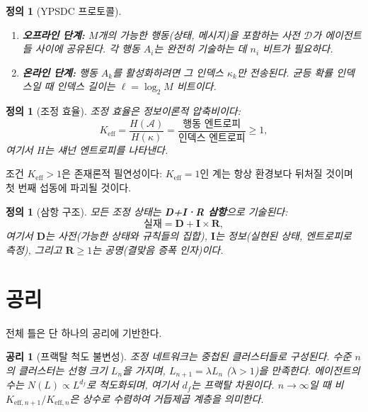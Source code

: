 \documentclass[12pt,a4paper]{article}
\newtheorem{axiom}[theorem]{공리}
\newtheorem{definition}[theorem]{정의}
\theoremstyle{remark}
\newcommand{\Keff}{K_{\mathrm{eff}}}
\begin{document}
	\begin{definition}[YPSDC 프로토콜]
		\begin{enumerate}[label=(\roman*)]
			\item \textbf{오프라인 단계:} \(M\)개의 가능한 행동(상태, 메시지)을 포함하는 사전 \(\mathcal{D}\)가 에이전트들 사이에 공유된다. 각 행동 \(A_i\)는 완전히 기술하는 데 \(n_i\) 비트가 필요하다.
			\item \textbf{온라인 단계:} 행동 \(A_k\)를 활성화하려면 그 인덱스 \(\kappa_k\)만 전송된다. 균등 확률 인덱스일 때 인덱스 길이는 \(\ell = \log_2 M\) 비트이다.
		\end{enumerate}
	\end{definition}
	
	\begin{definition}[조정 효율]
		조정 효율은 정보이론적 압축비이다:
		\begin{equation}
			\Keff = \frac{H(\mathcal{A})}{H(\kappa)} = \frac{\text{행동 엔트로피}}{\text{인덱스 엔트로피}} \ge 1,
			\label{eq:keff}
		\end{equation}
		여기서 \(H\)는 섀넌 엔트로피를 나타낸다.
	\end{definition}
	
	조건 \(K_{\mathrm{eff}} > 1\)은 존재론적 필연성이다: \(K_{\mathrm{eff}} = 1\)인 계는 항상 환경보다 뒤처질 것이며 첫 번째 섭동에 파괴될 것이다.
	
	\begin{definition}[삼항 구조]
		모든 조정 상태는 \textbf{D+I·R 삼항}으로 기술된다:
		\[
		\text{실재} = \mathbf{D} + \mathbf{I} \times \mathbf{R},
		\]
		여기서 \(\mathbf{D}\)는 사전(가능한 상태와 규칙들의 집합), \(\mathbf{I}\)는 정보(실현된 상태, 엔트로피로 측정), 그리고 \(\mathbf{R} \ge 1\)는 공명(결맞음 증폭 인자)이다.
	\end{definition}
	
	\section{공리}
	\label{sec:axioms}
	
	전체 틀은 단 하나의 공리에 기반한다.
	
	\begin{axiom}[프랙탈 척도 불변성]
		\label{ax:A1}
		조정 네트워크는 중첩된 클러스터들로 구성된다. 수준 \(n\)의 클러스터는 선형 크기 \(L_n\)을 가지며, \(L_{n+1} = \lambda L_n\) (\(\lambda > 1\))을 만족한다. 에이전트의 수는 \(N(L) \propto L^{d_f}\)로 척도화되며, 여기서 \(d_f\)는 프랙탈 차원이다. \(n \to \infty\)일 때 비 \(K_{\mathrm{eff},n+1}/K_{\mathrm{eff},n}\)은 상수로 수렴하여 거듭제곱 계층을 의미한다.
	\end{axiom}
	
\end{document}

